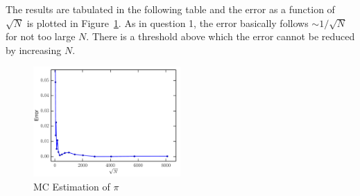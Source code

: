 \documentclass[11pt,letterpaper]{article}
\begin{document}
The results are tabulated in the following table and the error as a function of $\sqrt{N}$ is plotted in Figure~\ref{fig2}. As in question 1, the error basically follows $\sim 1/\sqrt{N}$ for not too large $N$. There is a threshold above which the error cannot be reduced by increasing $N$.
\begin{figure}[ht]
\centering
\includegraphics[width=0.5\textwidth]{fig2.pdf}
\caption{MC Estimation of $\pi$}
\label{fig2}
\end{figure}
\end{document}
